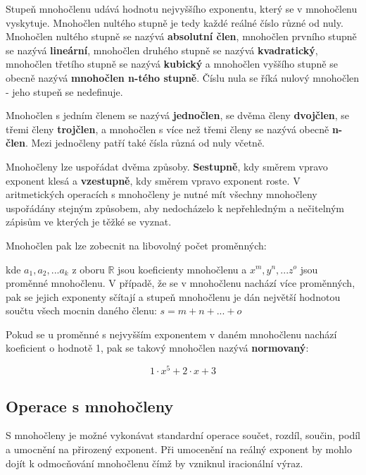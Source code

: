 \documentclass[11pt]{article}
\begin{document}
Stupeň mnohočlenu udává hodnotu nejvyššího exponentu, který se v mnohočlenu vyskytuje. Mnohočlen nultého stupně je tedy každé reálné číslo různé od nuly. Mnohočlen nultého stupně se nazývá {\bf absolutní člen}, mnohočlen prvního stupně se nazývá {\bf lineární}, mnohočlen druhého stupně se nazývá {\bf kvadratický}, mnohočlen třetího stupně se nazývá {\bf kubický} a mnohočlen vyššího stupně se obecně nazývá {\bf mnohočlen n-tého stupně}. Číslu nula se říká nulový mnohočlen - jeho stupeň se nedefinuje. 

Mnohočlen s jedním členem se nazývá {\bf jednočlen}, se dvěma členy {\bf dvojčlen}, se třemi členy {\bf trojčlen}, a mnohočlen s více než třemi členy se nazývá obecně {\bf n-člen}. Mezi jednočleny patří také čísla různá od nuly včetně. 

Mnohočleny lze uspořádat dvěma způsoby. {\bf Sestupně}, kdy směrem vpravo exponent klesá a {\bf vzestupně}, kdy směrem vpravo exponent roste. V aritmetických operacích s mnohočleny je nutné mít všechny mnohočleny uspořádány stejným způsobem, aby nedocházelo k nepřehledným a nečitelným zápisům ve kterých je těžké se vyznat.

Mnohočlen pak lze zobecnit na libovolný počet proměnných:

\begin{center}
\end{center}

kde $a_1, a_2, ... a_k$ z oboru $\mathbb{R}$ jsou koeficienty mnohočlenu a $x^{m}, y^{n}, ... z^{o}$ jsou proměnné mnohočlenu. V případě, že se v mnohočlenu nachází více proměnných, pak se jejich exponenty sčítají a stupeň mnohočlenu je dán největší hodnotou součtu všech mocnin daného členu: $s = m + n + ... + o$


Pokud se u proměnné s nejvyšším exponentem v daném mnohočlenu nachází koeficient o hodnotě 1, pak se takový mnohočlen nazývá {\bf normovaný}:

$$ 1\cdot x^5 + 2\cdot x +3$$


\subsection{Operace s mnohočleny}

S mnohočleny je možné vykonávat standardní operace součet, rozdíl, součin, podíl a umocnění na přirozený exponent. Při umocenění na reálný exponent by mohlo dojít k odmocňování mnohočlenu čímž by vzniknul iracionální výraz. 
\end{document}

